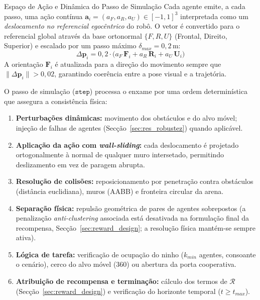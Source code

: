 \documentclass[12pt,reqno, twoside]{amsbook}
\makeatletter
\def\subsection{\@startsection{subsection}{2}%
      \z@{.5\linespacing\@plus.7\linespacing}{.25\linespacing}%
      {\normalfont\bfseries\flushleft}}
\theoremstyle{plain}
\numberwithin{equation}{chapter}
\numberwithin{section}{chapter}
\numberwithin{table}{chapter}
\numberwithin{figure}{chapter}
\makeatother
\begin{document}
\subsection{Espaço de Ação e Dinâmica do Passo de Simulação}
\label{sec:action_space}
Cada agente emite, a cada passo, uma ação contínua $\mathbf{a}_i = (a_F, a_R, a_U) \in [-1,1]^3$ interpretada como um \emph{deslocamento no referencial egocêntrico} do robô. O vetor é convertido para o referencial global através da base ortonormal $\{F, R, U\}$ (Frontal, Direito, Superior) e escalado por um passo máximo $\delta_{max}=0{,}2$\,m:
\begin{equation}
    \Delta \mathbf{p}_i = 0{,}2 \cdot \big( a_F\, \mathbf{F}_i + a_R\, \mathbf{R}_i + a_U\, \mathbf{U}_i \big)
\end{equation}
A orientação $\mathbf{F}_i$ é atualizada para a direção do movimento sempre que $\lVert \Delta\mathbf{p}_i \rVert > 0{,}02$, garantindo coerência entre a pose visual e a trajetória.

O passo de simulação ($\texttt{step}$) processa o enxame por uma ordem determinística que assegura a consistência física:
\begin{enumerate}
    \item \textbf{Perturbações dinâmicas:} movimento dos obstáculos e do alvo móvel; injeção de falhas de agentes (Secção~\ref{sec:res_robustez}) quando aplicável.
    \item \textbf{Aplicação da ação com \textit{wall-sliding}:} cada deslocamento é projetado ortogonalmente à normal de qualquer muro intersetado, permitindo deslizamento em vez de paragem abrupta.
    \item \textbf{Resolução de colisões:} reposicionamento por penetração contra obstáculos (distância euclidiana), muros (AABB) e fronteira circular da arena.
    \item \textbf{Separação física:} repulsão geométrica de pares de agentes sobrepostos (a penalização \textit{anti-clustering} associada está desativada na formulação final da recompensa, Secção~\ref{sec:reward_design}; a resolução física mantém-se sempre ativa).
    \item \textbf{Lógica de tarefa:} verificação de ocupação do ninho ($k_{min}$ agentes, consoante o cenário), cerco do alvo móvel (360\textdegree{}) ou abertura da porta cooperativa.
    \item \textbf{Atribuição de recompensa e terminação:} cálculo dos termos de $\mathcal{R}$ (Secção~\ref{sec:reward_design}) e verificação do horizonte temporal ($t \ge t_{max}$).
\end{enumerate}
\end{document}
